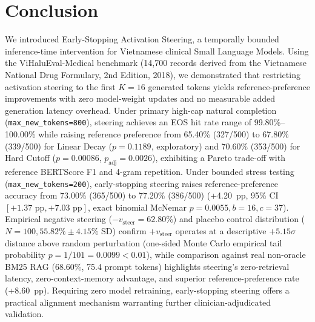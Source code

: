 \documentclass[conference]{IEEEtran}
\begin{document}
\section{Conclusion}
We introduced Early-Stopping Activation Steering, a temporally bounded inference-time intervention for Vietnamese clinical Small Language Models. Using the ViHaluEval-Medical benchmark (14,700 records derived from the Vietnamese National Drug Formulary, 2nd Edition, 2018), we demonstrated that restricting activation steering to the first $K=16$ generated tokens yields reference-preference improvements with zero model-weight updates and no measurable added generation latency overhead. Under primary high-cap natural completion (\texttt{max\_new\_tokens=800}), steering achieves an EOS hit rate range of 99.80\%--100.00\% while raising reference preference from 65.40\% (327/500) to 67.80\% (339/500) for Linear Decay ($p=0.1189$, exploratory) and 70.60\% (353/500) for Hard Cutoff ($p=0.00086$, $p_{\text{adj}}=0.0026$), exhibiting a Pareto trade-off with reference BERTScore F1 and 4-gram repetition. Under bounded stress testing (\texttt{max\_new\_tokens=200}), early-stopping steering raises reference-preference accuracy from 73.00\% (365/500) to 77.20\% (386/500) (+4.20~pp, 95\% CI $[+1.37\text{ pp}, +7.03\text{ pp}]$, exact binomial McNemar $p=0.0055, b=16, c=37$). Empirical negative steering ($-v_{\text{steer}}=62.80\%$) and placebo control distribution ($N=100, 55.82\%\pm4.15\%$ SD) confirm $+v_{\text{steer}}$ operates at a descriptive $+5.15\sigma$ distance above random perturbation (one-sided Monte Carlo empirical tail probability $p=1/101=0.0099 < 0.01$), while comparison against real non-oracle BM25 RAG (68.60\%, 75.4 prompt tokens) highlights steering's zero-retrieval latency, zero-context-memory advantage, and superior reference-preference rate (+8.60~pp). Requiring zero model retraining, early-stopping steering offers a practical alignment mechanism warranting further clinician-adjudicated validation.
\end{document}
